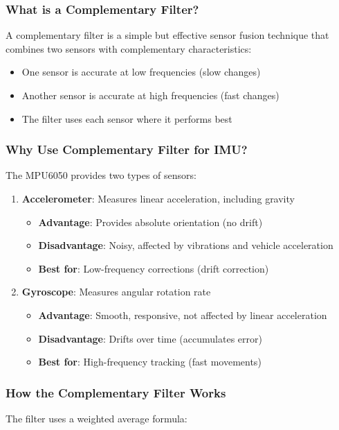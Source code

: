 \documentclass[11pt,a4paper]{article}
\begin{document}
\subsubsection{What is a Complementary Filter?}
A complementary filter is a simple but effective sensor fusion technique that combines two sensors with complementary characteristics:
\begin{itemize}
    \item One sensor is accurate at low frequencies (slow changes)
    \item Another sensor is accurate at high frequencies (fast changes)
    \item The filter uses each sensor where it performs best
\end{itemize}

\subsubsection{Why Use Complementary Filter for IMU?}
The MPU6050 provides two types of sensors:
\begin{enumerate}
    \item \textbf{Accelerometer}: Measures linear acceleration, including gravity
    \begin{itemize}
        \item \textbf{Advantage}: Provides absolute orientation (no drift)
        \item \textbf{Disadvantage}: Noisy, affected by vibrations and vehicle acceleration
        \item \textbf{Best for}: Low-frequency corrections (drift correction)
    \end{itemize}
    \item \textbf{Gyroscope}: Measures angular rotation rate
    \begin{itemize}
        \item \textbf{Advantage}: Smooth, responsive, not affected by linear acceleration
        \item \textbf{Disadvantage}: Drifts over time (accumulates error)
        \item \textbf{Best for}: High-frequency tracking (fast movements)
    \end{itemize}
\end{enumerate}

\subsubsection{How the Complementary Filter Works}
The filter uses a weighted average formula:
\end{document}
